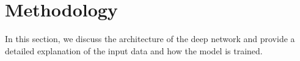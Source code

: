 \documentclass[journal]{IEEEtran}
\begin{document}





\section{Methodology}

In this section, we discuss the architecture of the deep network and provide a detailed explanation of the input data and how the model is trained.
\end{document}
